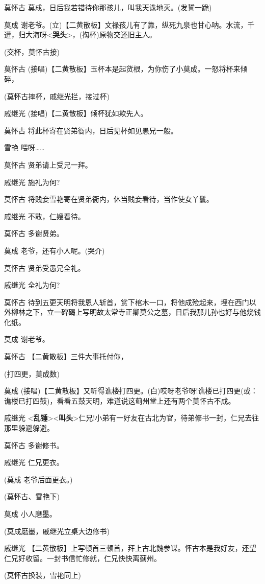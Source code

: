 莫怀古 莫成，日后我若错待你那孩儿，叫我天诛地灭。(发誓一跪)

莫成
谢老爷。(立)【二黄散板】文禄孩儿有了靠，纵死九泉也甘心呐。水流，千遭，归大海呀\textless{}\textbf{哭头}\textgreater{}，(掏杯)原物交还旧主人。

(交杯，莫怀古接)

莫怀古
(接唱)【二黄散板】玉杯本是起货根，为你伤了小莫成。一怒将杯来倾碎，

(莫怀古摔杯，戚继光拦，接过杯)

戚继光 (接唱)【二黄散板】倾杯犹如欺先人。

莫怀古 将此杯寄在贤弟衙内，日后见杯如见愚兄一般。

雪艳 喂呀\ldots{}\ldots{}

莫怀古 贤弟请上受兄一拜。

戚继光 施礼为何?

莫怀古 将贱妾雪艳寄在贤弟衙内，休当贱妾看待，当作使女丫鬟。

戚继光 不敢，仁嫂看待。

莫怀古 多谢贤弟。

莫成 老爷，还有小人呢。(哭介)

莫怀古 贤弟受愚兄全礼。

戚继光 全礼为何?

莫怀古
待到五更天明将我恩人斩首，赏下棺木一口，将他成殓起来，埋在西门以外柳林之下，立一碑碣上写明故太常寺正卿莫公之墓，日后我那儿孙也好与他烧钱化纸。

莫成 谢老爷。

莫怀古 【二黄散板】三件大事托付你，

(打四更，莫成数)

莫成
(接唱)【二黄散板】又听得谯楼打四更。(白)哎呀老爷呀!谯楼已打四更(或：谯楼已打四鼓)，看看五鼓天明，难道说这蓟州堂上还有两个莫怀古不成。

戚继光
\textless{}\textbf{乱锤}\textgreater{}\textless{}\textbf{叫头}\textgreater{}仁兄!小弟有一好友在古北为官，待弟修书一封，仁兄去往那里躲避躲避。

莫怀古 多谢修书。

戚继光 仁兄更衣。

(莫成 老爷后面更衣。)

(莫怀古、雪艳下)

莫成 小人磨墨。

(莫成磨墨，戚继光立桌大边修书)

戚继光
【二黄散板】上写顿首三顿首，拜上古北魏参谋。怀古本是我好友，还望仁兄好收留。一封书信忙修就，仁兄快快离蓟州。

(莫怀古换装，雪艳同上)

